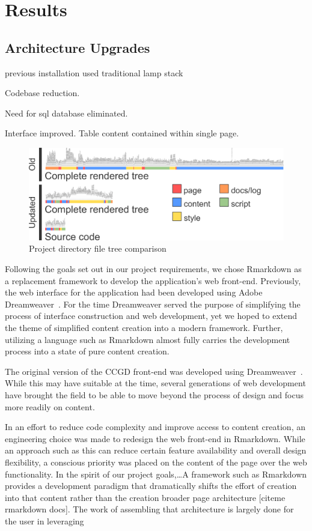 \documentclass[10pt]{report}
\begin{document}
\section{Results}

\subsection{Architecture Upgrades}
previous installation used traditional lamp stack

Codebase reduction.

Need for sql database eliminated.

Interface improved. Table content contained within single page.

\begin{figure}[H]
    \centering
    \includegraphics[width=\textwidth]{fig/file_tree.png}
    \caption{Project directory file tree comparison}\label{fig:fileTree}
\end{figure}

Following the goals set out in our project requirements, we chose Rmarkdown as a replacement framework to develop the application's web front-end. Previously, the web interface for the application had been developed using Adobe Dreamweaver~\cite{Abbott2015}. For the time Dreamweaver served the purpose of simplifying the process of interface construction and web development, yet we hoped to extend the theme of simplified content creation into a modern framework. Further, utilizing a language such as Rmarkdown almost fully carries the development process into a state of pure content creation.

The original version of the CCGD front-end was developed using Dreamweaver~\cite{Abbott2015}. While this may have suitable at the time, several generations of web development have brought the field to be able to move beyond the process of design and focus more readily on content.

In an effort to reduce code complexity and improve access to content creation, an engineering choice was made to redesign the web front-end in Rmarkdown. While an approach such as this can reduce certain feature availability and overall design flexibility, a conscious priority was placed on the content of the page over the web functionality. In the spirit of our project goals,\ldots A framework such as Rmarkdown provides a development paradigm that dramatically shifts the effort of creation into that content rather than the creation broader page architecture [citeme rmarkdown docs]. The work of assembling that architecture is largely done for the user in leveraging
\end{document}
